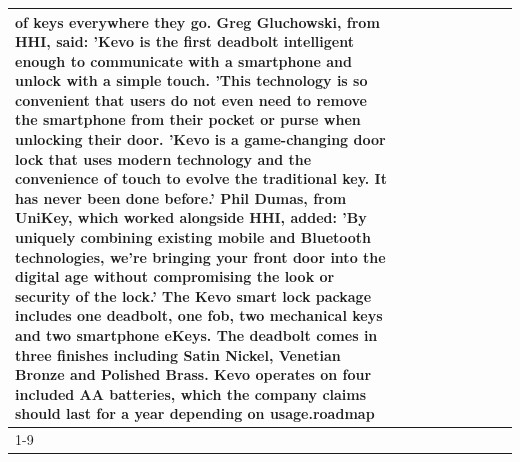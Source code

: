 \begin{table}[H]
\begin{tabular}{lllrlllll}
of keys everywhere they go. Greg Gluchowski, from HHI, said: 'Kevo is the first deadbolt intelligent enough to communicate with a smartphone and unlock with a simple touch. 'This technology is so convenient that users do not even need to remove the smartphone from their pocket or purse when unlocking their door. 'Kevo is a game-changing door lock that uses modern technology and the convenience of touch to evolve the traditional key. It has never been done before.' Phil Dumas, from UniKey, which worked alongside HHI, added: 'By uniquely combining existing mobile and Bluetooth technologies, we’re bringing your front door into the digital age without compromising the look or security of the lock.' The Kevo smart lock package includes one deadbolt, one fob, two mechanical keys and two smartphone eKeys. The deadbolt comes in three finishes including Satin Nickel, Venetian Bronze and Polished Brass. Kevo operates on four included AA batteries, which the company claims should last for a year depending on usage.roadmap \\
\cline{1-9}

\end{tabular}
\end{table}
